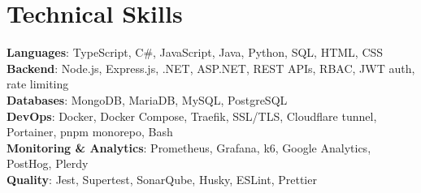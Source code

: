 \section{Technical Skills}
    \begin{itemize}[leftmargin=0.15in, label={}]
	\small{\item{
		\textbf{Languages}{: TypeScript, C\#, JavaScript, Java, Python, SQL, HTML, CSS} \\
		\textbf{Backend}{: Node.js, Express.js, .NET, ASP.NET, REST APIs, RBAC, JWT auth, rate limiting} \\
		\textbf{Databases}{: MongoDB, MariaDB, MySQL, PostgreSQL} \\
		\textbf{DevOps}{: Docker, Docker Compose, Traefik, SSL/TLS, Cloudflare tunnel, Portainer, pnpm monorepo, Bash} \\
		\textbf{Monitoring \& Analytics}{: Prometheus, Grafana, k6, Google Analytics, PostHog, Plerdy} \\
		\textbf{Quality}{: Jest, Supertest, SonarQube, Husky, ESLint, Prettier}
	}}
    \end{itemize}
